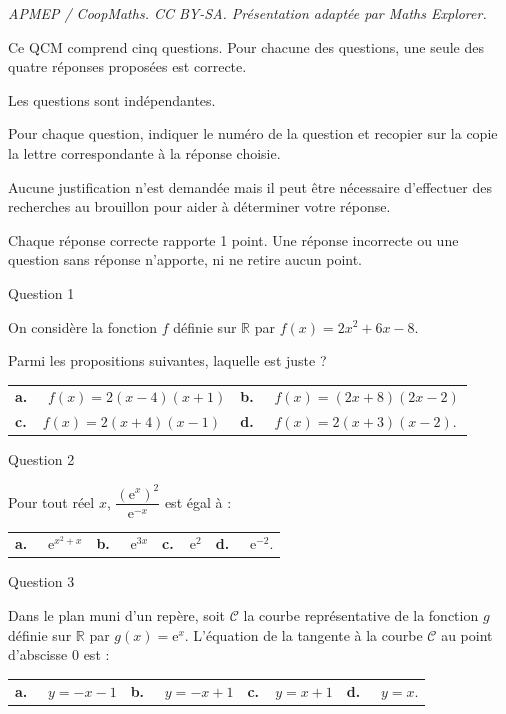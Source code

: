 \documentclass[10pt]{article}
\providecommand{\R}{\mathbb{R}}
\providecommand{\e}{{\mathrm{e}}}
\begin{document}
\noindent\textit{APMEP / CoopMaths. CC BY-SA. Présentation adaptée par Maths Explorer.}\par\medskip
\medskip

Ce QCM comprend cinq questions.
 Pour chacune des questions, une seule des quatre
réponses proposées est correcte. 

Les questions sont indépendantes.

Pour chaque question, indiquer le numéro de la question et recopier sur la copie la lettre
correspondante à la réponse choisie.

Aucune justification n’est demandée mais il peut être nécessaire d’effectuer des recherches
au brouillon pour aider à déterminer votre réponse.

Chaque réponse correcte rapporte 1 point. Une réponse incorrecte ou une question sans
réponse n’apporte, ni ne retire aucun point.

\medskip
Question 1
\medskip 


On considère la fonction $f$ définie sur $\R$ par $f(x)=2x^2 +6x-8$.

 Parmi les propositions suivantes, laquelle est juste ?
 
 \begin{tabularx}{\linewidth}{*{2}{X}}
\textbf{a.~~} $f(x)= 2( x - 4)(x +1)$ &\textbf{b.~~} $f(x)= (2x+8)(2x-2) $\\
\textbf{c.~~}$f(x)= 2(x+4)(x-1) $& \textbf{d.~~} $ f(x)= 2(x+3)(x-2)$.
\end{tabularx}

\medskip
Question 2
\medskip 

Pour tout réel $x$, $\dfrac{(\e^x)^2}{\e^{-x}}$ est égal à :

\begin{tabularx}{\linewidth}{*{4}{X}}
\textbf{a.~~} $\e^{x^2+x}$ &\textbf{b.~~} $\e^{3x} $&\textbf{c.~~}$\e^2 $& \textbf{d.~~} $\e^{-2} $.
\end{tabularx}

 \medskip
Question 3
 \medskip 

 Dans le plan muni d’un repère, soit  $\mathcal{C}$ la courbe représentative de la fonction $g$ définie sur $\R$
 par $g(x)=\e^x $. L’équation de la tangente à la courbe $\mathcal{C}$ au point d’abscisse 0 est :
 
 \begin{tabularx}{\linewidth}{*{4}{X}}
\textbf{a.~~} $y=-x-1 $ &\textbf{b.~~} $y=-x+1 $&\textbf{c.~~}$ y=x+1$& \textbf{d.~~} $ y=x$.
\end{tabularx}
\end{document}
